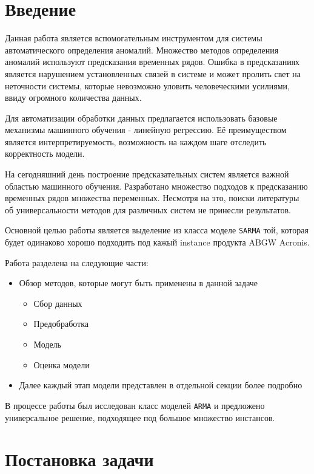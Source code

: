 \documentclass[14pt, a4paper]{extarticle}
\begin{document}
	\section{Введение}
	Данная работа является вспомогательным инструментом для системы автоматического определения аномалий.
	Множество методов определения аномалий используют предсказания временных рядов. 
	Ошибка в предсказаниях является нарушением установленных связей в системе и может пролить свет на неточности системы, которые невозможно уловить человеческими усилиями, ввиду огромного количества данных.
	
	Для автоматизации обработки данных предлагается использовать базовые механизмы машинного обучения - линейную регрессию. 
	Её преимуществом является интерпретируемость, возможность на каждом шаге отследить корректность модели.
	
	На сегодняшний день построение предсказательных систем является важной областью машинного обучения.
	Разработано множество подходов к предсказанию временных рядов множества переменных.
	Несмотря на это, поиски литературы об универсальности методов для различных систем не принесли результатов. 
		
	Основной целью работы является выделение из класса моделе \texttt{SARMA} той, которая будет одинаково хорошо подходить под кажый instance продукта ABGW Acronis.
	
	Работа разделена на следующие части:
	\begin{itemize}
	\item Обзор методов, которые могут быть применены в данной задаче
		\begin{itemize}
		\item Сбор данных
		\item Предобработка
		\item Модель
		\item Оценка модели
		\end{itemize}
	\item Далее каждый этап модели представлен в отдельной секции более подробно
	\end{itemize}
	
	В процессе работы был исследован класс моделей \texttt{ARMA} и предложено универсальное решение, подходящее под большое множество инстансов.
				
	\section{Постановка задачи}
\end{document}
